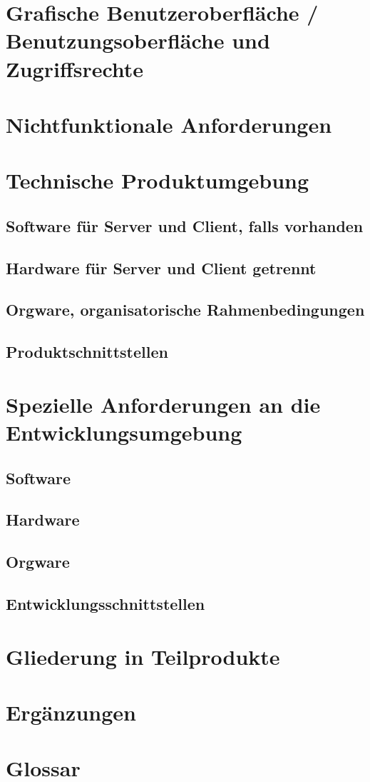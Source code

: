 \documentclass[a4paper,11pt]{article}             %
\begin{document}
\section{Grafische Benutzeroberfläche / Benutzungsoberfläche und Zugriffsrechte}
\section{Nichtfunktionale Anforderungen}
\section{Technische Produktumgebung}
	\subsection{Software für Server und Client, falls vorhanden}
	\subsection{Hardware für Server und Client getrennt}
	\subsection{Orgware, organisatorische Rahmenbedingungen}
	\subsection{Produktschnittstellen}
\section{Spezielle Anforderungen an die Entwicklungsumgebung}
	\subsection{Software}
	\subsection{Hardware}
	\subsection{Orgware}
	\subsection{Entwicklungsschnittstellen}
\section{Gliederung in Teilprodukte}
\section{Ergänzungen}
\section{Glossar}
\end{document}
